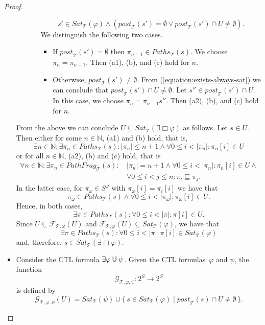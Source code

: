 \documentclass[12pt]{article}
\newcommand{\always}{\Box}
\newcommand{\until}{\mathbin{\sf U}}
\theoremstyle{definition}
\begin{document}
\begin{proof}
\begin{itemize}
\begin{itemize}
\begin{itemize}
\begin{equation}
\label{equation:exists-always-sat}
s' \in \mathit{Sat}_{\mathcal{T}}(\varphi) \wedge (\mathit{post}_{\mathcal{T}}(s') = \emptyset \vee \mathit{post}_{\mathcal{T}}(s') \cap U \not= \emptyset).
\end{equation}
We distinguish the following two cases.
\begin{itemize}
\item 
If $\mathit{post}_{\mathcal{T}}(s') = \emptyset$ then $\pi_{n-1} \in \mathit{Paths}_{\mathcal{T}}(s)$.  We choose $\pi_n = \pi_{n-1}$.  Then (a1), (b), and (c) hold for $n$.
\item
Otherwise, $\mathit{post}_{\mathcal{T}}(s') \not= \emptyset$.  From (\ref{equation:exists-always-sat}) we can conclude that $\mathit{post}_{\mathcal{T}}(s') \cap U \not= \emptyset$.  Let $s'' \in \mathit{post}_{\mathcal{T}}(s') \cap U$.  In this case, we choose $\pi_n = \pi_{n-1} s''$.  Then (a2), (b), and (c) hold for $n$.
\end{itemize}
\end{itemize}
\end{itemize}
From the above we can conclude $U \subseteq \mathit{Sat}_{\mathcal{T}}(\exists \always \varphi)$ as follows.  Let $s \in U$.  Then either for some $n \in \mathbb{N}$, (a1) and (b) hold, that is,
\[
\exists n \in \mathbb{N} : \exists \pi_n \in \mathit{Paths}_{\mathcal{T}}(s) : |\pi_n| \leq n + 1 \wedge\forall 0 \leq i < |\pi_n| : \pi_n[i] \in U
\]
or for all  $n \in \mathbb{N}$, (a2), (b) and (c) hold, that is
\begin{align*}
\forall n \in \mathbb{N} : \exists \pi_n \in \mathit{PathFrag}_{\mathcal{T}}(s) :\, & |\pi_n| = n + 1 \wedge \forall 0 \leq i < |\pi_n| : \pi_n[i] \in U \wedge\\
& \forall 0 \leq i < j \leq n: \pi_i \sqsubseteq \pi_j.
\end{align*}
In the latter case, for $\pi_{\omega} \in S^{\omega}$ with $\pi_{\omega}[i] = \pi_i[i]$ we have that 
\[
\pi_{\omega} \in \mathit{Paths}_{\mathcal{T}}(s) \wedge \forall 0 \leq i < |\pi_{\omega}| : \pi_{\omega}[i] \in U.
\]
Hence, in both cases,
\[
\exists \pi \in \mathit{Paths}_{\mathcal{T}}(s) : \forall 0 \leq i < |\pi| : \pi[i] \in U.
\]
Since $U \subseteq \mathcal{F}_{\mathcal{T}, \varphi}(U)$ and $\mathcal{F}_{\mathcal{T}, \varphi}(U) \subseteq \mathit{Sat}_{\mathcal{T}}(\varphi)$, we have that 
\[
\exists \pi \in \mathit{Paths}_{\mathcal{T}}(s) : \forall 0 \leq i < |\pi| : \pi[i] \in \mathit{Sat}_{\mathcal{T}}(\varphi)
\]
and, therefore, $s \in \mathit{Sat}_{\mathcal{T}}(\exists \always \varphi)$.
\item
Consider the CTL formula $\exists \varphi \until \psi$.  Given the CTL formulas~$\varphi$ and $\psi$, the function
\[
\mathcal{G}_{\mathcal{T}, \varphi,\psi} : 2^S \to 2^S
\]
is defined by
\[
\mathcal{G}_{\mathcal{T}, \varphi,\psi}(U) = \mathit{Sat}_{\mathcal{T}}(\psi) \cup \{\, s \in \mathit{Sat}_{\mathcal{T}}(\varphi) \mid \mathit{post}_{\mathcal{T}}(s) \cap U \not= \emptyset \,\}.
\]


\end{itemize}
\end{proof}
\end{document}
